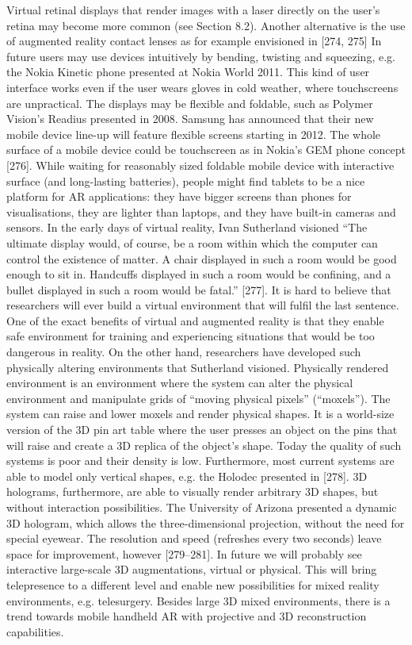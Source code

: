 Virtual retinal displays that render images with a laser directly on the user’s retina may become more common (see Section 8.2). Another alternative is the use of augmented reality contact lenses as for example envisioned in [274, 275] In future users may use devices intuitively by bending, twisting and squeezing, e.g. the Nokia Kinetic phone presented at Nokia World 2011. This kind of user interface works even if the user wears gloves in cold weather, where touchscreens are unpractical. The displays may be flexible and foldable, such as Polymer Vision’s Readius presented in 2008. Samsung has announced that their new mobile device line-up will feature flexible screens starting in 2012. The whole surface of a mobile device could be touchscreen as in Nokia’s GEM phone concept [276]. While waiting for reasonably sized foldable mobile device with interactive surface (and long-lasting batteries), people might find tablets to be a nice platform for AR applications: they have bigger screens than phones for visualisations, they are lighter than laptops, and they have built-in cameras and sensors. In the early days of virtual reality, Ivan Sutherland visioned “The ultimate display would, of course, be a room within which the computer can control the existence of matter. A chair displayed in such a room would be good enough to sit in. Handcuffs displayed in such a room would be confining, and a bullet displayed in such a room would be fatal.” [277]. It is hard to believe that researchers will ever build a virtual environment that will fulfil the last sentence. One of the exact benefits of virtual and augmented reality is that they enable safe environment for training and experiencing situations that would be too dangerous in reality. On the other hand, researchers have developed such physically altering environments that Sutherland visioned. Physically rendered environment is an environment where the system can alter the physical environment and manipulate grids of “moving physical pixels” (“moxels”). The system can raise and lower moxels and render physical shapes. It is a world-size version of the 3D pin art table where the user presses an object on the pins that will raise and create a 3D replica of the object’s shape. Today the quality of such systems is poor and their density is low. Furthermore, most current systems are able to model only vertical shapes, e.g. the Holodec presented in [278]. 3D holograms, furthermore, are able to visually render arbitrary 3D shapes, but without interaction possibilities. The University of Arizona presented a dynamic 3D hologram, which allows the three-dimensional projection, without the need for special eyewear. The resolution and speed (refreshes every two seconds) leave space for improvement, however [279–281]. In future we will probably see interactive large-scale 3D augmentations, virtual or physical. This will bring telepresence to a different level and enable new possibilities for mixed reality environments, e.g. telesurgery. Besides large 3D mixed environments, there is a trend towards mobile handheld AR with projective and 3D reconstruction capabilities.

